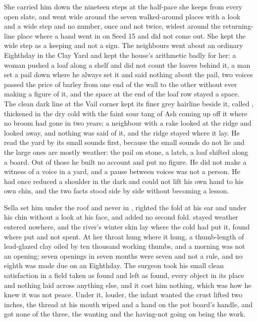 She carried him down the nineteen steps at the half-pace she keeps from every open slate, and went wide around the seven walked-around places with a look and a wide step and no number, once and not twice, widest around the returning-line place where a hand went in on Seed 15 and did not come out. She kept the wide step as a keeping and not a sign. The neighbours went about an ordinary Eighthday in the Clay Yard and kept the house's arithmetic badly for her: a woman pushed a loaf along a shelf and did not count the loaves behind it, a man set a pail down where he always set it and said nothing about the pail, two voices passed the price of barley from one end of the wall to the other without ever making a figure of it, and the space at the end of the loaf row stayed a space. The clean dark line at the Vail corner kept its finer grey hairline beside it, called , thickened in the dry cold with the faint sour tang of Ash coming up off it where no broom had gone in two years; a neighbour with a rake looked at the ridge and looked away, and nothing was said of it, and the ridge stayed where it lay. He read the yard by its small sounds first, because the small sounds do not lie and the large ones are mostly weather: the pail on stone, a latch, a loaf shifted along a board. Out of those he built no account and put no figure. He did not make a witness of a voice in a yard, and a pause between voices was not a person. He had once reduced a shoulder in the dark and could not lift his own hand to his own chin, and the two facts stood side by side without becoming a lesson.

Sella set him under the roof and never in , righted the fold at his ear and under his chin without a look at his face, and added no second fold.  stayed weather entered nowhere, and the river's winter skin lay where the cold had put it, found where put and not spent. At her throat  hung where it hung, a thumb-length of lead-glazed clay oiled by ten thousand working thumbs, and a morning was not an opening; seven openings in seven months were seven and not a rule, and no eighth was made due on an Eighthday. The surgeon took his small clean satisfaction in a field taken as found and left as found, every object in its place and nothing laid across anything else, and it cost him nothing, which was how he knew it was not peace. Under it, louder, the infant wanted the crust lifted two inches, the thread at his mouth wiped and a hand on the pot board's handle, and got none of the three, the wanting and the having-not going on being the work.


